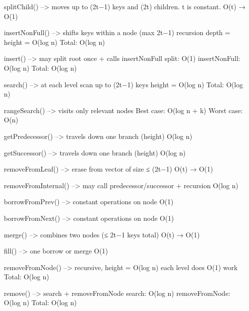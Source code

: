 splitChild() --> moves up to (2t−1) keys and (2t) children.
                 t is constant.
                 O(t) → O(1)

insertNonFull() --> shifts keys within a node (max 2t−1)
                    recursion depth = height = O(log n)
                    Total: O(log n)

insert() --> may split root once + calls insertNonFull
             split: O(1)
             insertNonFull: O(log n)
             Total: O(log n)

search() --> at each level scan up to (2t−1) keys
             height = O(log n)
             Total: O(log n)

rangeSearch() --> visits only relevant nodes
                  Best case: O(log n + k)
                  Worst case: O(n)

getPredecessor() --> travels down one branch (height)
                     O(log n)

getSuccessor() --> travels down one branch (height)
                   O(log n)

removeFromLeaf() --> erase from vector of size ≤ (2t−1)
                     O(t) → O(1)

removeFromInternal() --> may call predecessor/successor + recursion
                        O(log n)

borrowFromPrev() --> constant operations on node
                     O(1)

borrowFromNext() --> constant operations on node
                     O(1)

merge() --> combines two nodes (≤ 2t−1 keys total)
            O(t) → O(1)

fill() --> one borrow or merge
           O(1)

removeFromNode() --> recursive, height = O(log n)
                     each level does O(1) work
                     Total: O(log n)

remove() --> search + removeFromNode
             search: O(log n)
             removeFromNode: O(log n)
             Total: O(log n)
